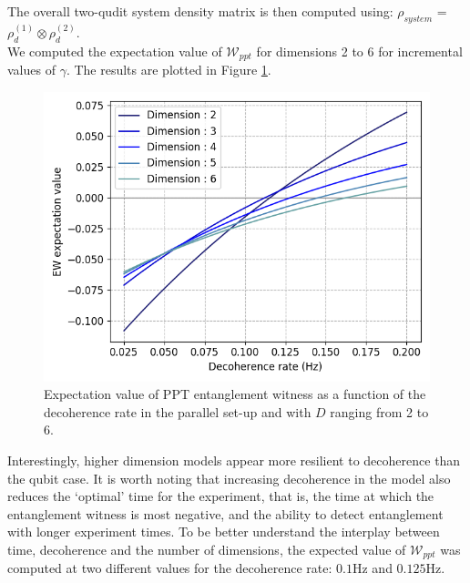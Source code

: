 \documentclass[%
 reprint,
 superscriptaddress,
 amsmath,
 amssymb,
 aps,
 longbibliography
]{revtex4-2}
\begin{document}
\indent The overall two-qudit system density matrix is then computed using: $\rho_{system}$ = $\rho_d^{(1)}\otimes\rho_d^{(2)}$.\\
\indent We computed the expectation value of $\mathcal{W}_{ppt}$ for dimensions 2 to 6 for incremental values of $\gamma$. The results are plotted in Figure \ref{fig:qudit_deco}.\\
%	
	\begin{figure}
	\centering
		\includegraphics[width=1.\columnwidth]{EW_para_qudits_deco.png}
	    \caption{Expectation value of PPT entanglement witness as a function of the decoherence rate in the parallel set-up and with $D$ ranging from 2 to 6.} \label{fig:qudit_deco}
		\par\medskip
	\end{figure}
%
\indent Interestingly, higher dimension models appear more resilient to decoherence than the qubit case. It is worth noting that increasing decoherence in the model also reduces the `optimal’ time for the experiment, that is, the time at which the entanglement witness is most negative, and the ability to detect entanglement with longer experiment times. To be better understand the interplay between time, decoherence and the number of dimensions, the expected value of $\mathcal{W}_{ppt}$ was computed at two different values for the decoherence rate: $0.1$Hz and $0.125$Hz.\\
\end{document}
